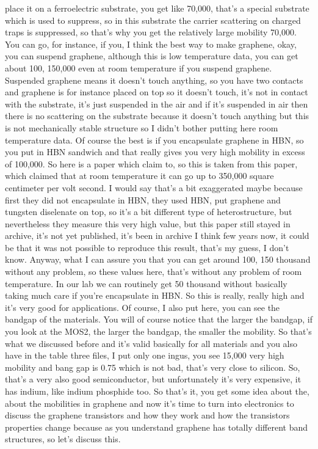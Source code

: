 place it on a ferroelectric substrate, you get like 70,000, that's a special substrate which is used to suppress, so in this substrate the carrier scattering on charged traps is suppressed, so that's why you get the relatively large mobility 70,000. You can go, for instance, if you, I think the best way to make graphene, okay, you can suspend graphene, although this is low temperature data, you can get about 100, 150,000 even at room temperature if you suspend graphene. Suspended graphene means it doesn't touch anything, so you have two contacts and graphene is for instance placed on top so it doesn't touch, it's not in contact with the substrate, it's just suspended in the air and if it's suspended in air then there is no scattering on the substrate because it doesn't touch anything but this is not mechanically stable structure so I didn't bother putting here room temperature data. Of course the best is if you encapsulate graphene in HBN, so you put in HBN sandwich and that really gives you very high mobility in excess of 100,000. So here is a paper which claim to, so this is taken from this paper, which claimed that at room temperature it can go up to 350,000 square centimeter per volt second. I would say that's a bit exaggerated maybe because first they did not encapsulate in HBN, they used HBN, put graphene and tungsten diselenate on top, so it's a bit different type of heterostructure, but nevertheless they measure this very high value, but this paper still stayed in archive, it's not yet published, it's been in archive I think few years now, it could be that it was not possible to reproduce this result, that's my guess, I don't know. Anyway, what I can assure you that you can get around 100, 150 thousand without any problem, so these values here, that's without any problem of room temperature. In our lab we can routinely get 50 thousand without basically taking much care if you're encapsulate in HBN. So this is really, really high and it's very good for applications. Of course, I also put here, you can see the bandgap of the materials. You will of course notice that the larger the bandgap, if you look at the MOS2, the larger the bandgap, the smaller the mobility. So that's what we discussed before and it's valid basically for all materials and you also have in the table three files, I put only one ingus, you see 15,000 very high mobility and bang gap is 0.75 which is not bad, that's very close to silicon. So, that's a very also good semiconductor, but unfortunately it's very expensive, it has indium, like indium phosphide too. So that's it, you get some idea about the, about the mobilities in graphene and now it's time to turn into electronics to discuss the graphene transistors and how they work and how the transistors properties change because as you understand graphene has totally different band structures, so let's discuss this.

